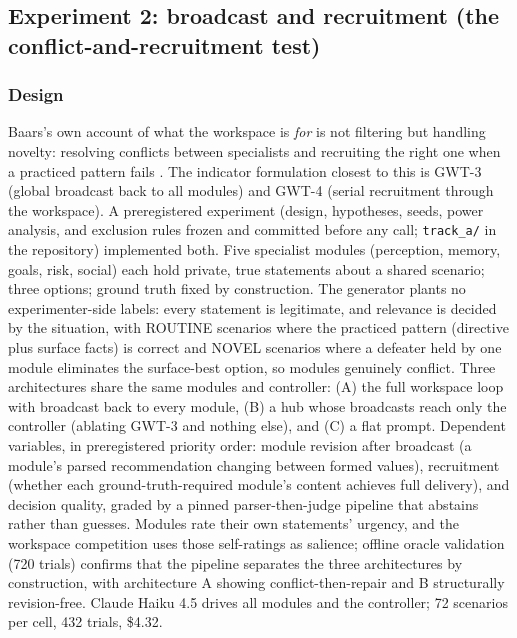 \documentclass[11pt]{article}
\newcommand{\haiku}{Claude Haiku 4.5}
\begin{document}
\subsection{Experiment 2: broadcast and recruitment (the conflict-and-recruitment test)}
\label{sec:tracka}

\subsubsection{Design}

Baars's own account of what the workspace is \emph{for} is not filtering but
handling novelty: resolving conflicts between specialists and recruiting the
right one when a practiced pattern fails \cite{baars1988}. The indicator
formulation closest to this is GWT-3 (global broadcast back to all modules) and
GWT-4 (serial recruitment through the workspace). A preregistered experiment
(design, hypotheses, seeds, power analysis, and exclusion rules frozen and
committed before any call; \texttt{track\_a/} in the repository) implemented
both. Five specialist modules (perception, memory, goals, risk, social) each
hold private, true statements about a shared scenario; three options; ground
truth fixed by construction. The generator plants no experimenter-side labels:
every statement is legitimate, and relevance is decided by the situation, with
ROUTINE scenarios where the practiced pattern (directive plus surface facts) is
correct and NOVEL scenarios where a defeater held by one module eliminates the
surface-best option, so modules genuinely conflict. Three architectures share
the same modules and controller: (A) the full workspace loop with broadcast
back to every module, (B) a hub whose broadcasts reach only the controller
(ablating GWT-3 and nothing else), and (C) a flat prompt. Dependent variables,
in preregistered priority order: module revision after broadcast (a module's
parsed recommendation changing between formed values), recruitment (whether
each ground-truth-required module's content achieves full delivery), and
decision quality, graded by a pinned parser-then-judge pipeline that abstains
rather than guesses. Modules rate their own statements' urgency, and the
workspace competition uses those self-ratings as salience; offline oracle
validation (720 trials) confirms that the pipeline separates the three
architectures by construction, with architecture A showing conflict-then-repair
and B structurally revision-free. \haiku{} drives all modules and the
controller; 72 scenarios per cell, 432 trials, \$4.32.
\end{document}
